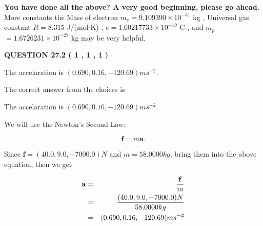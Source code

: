 \documentclass[12pt]{article}
\begin{document}
   
\vspace{0.3in}
{\textbf{\LARGE{You have done all the above? A very good beginning, please go ahead.}}}
More constants the
Mass of electron
$m_e$$ =
9.109390 \times 10^{-31} $
kg
,
Universal gas constant
$R$$ =
8.315 $
J/(mol$\cdot $K)
,
$e$$ =
1.60217733 \times 10^{-19} $
C
, and
$m_p$$ =
1.6726231 \times 10^{-27} $
kg
%
may be very helpful.
\vspace{0.3in}
   
   
  
\vspace{0.2in}
  
{\textbf{\Large{QUESTION
27.2 
 (           1 ,           1 ,           1 )
}}}
  
  


 
 
\noindent{}
 
 
The accelaration is $  %
(
0.690,
0.16,
-120.69)
ms^{-2} $.
 
 
 
 
 
 
\noindent{}

The correct answer from the choices is


The accelaration is $  %
(
0.690,
0.16,
-120.69)
ms^{-2} $.
 
 
 
 
 
\noindent{}

We will use the Newton's Second Law:
 
\[
\mathbf{f}=m\mathbf{a}.
\]
 
Since $\mathbf{f}= %
(40.0 , 9.0 , -7000.0) N$
and $m= %
58.0000kg$, bring them into the above equation, then we get
 
\begin{eqnarray*}
\mathbf{a}&=&\frac{\mathbf{f}}m  \\
&=&\frac{ %
(40.0 , 9.0 , -7000.0) N}{ %
58.0000kg}  \\
&=& %
(0.690 , 0.16 , -120.69) ms^{-2}
\end{eqnarray*}
 
 
 
  
\vspace{0.2in}
  
\end{document}
